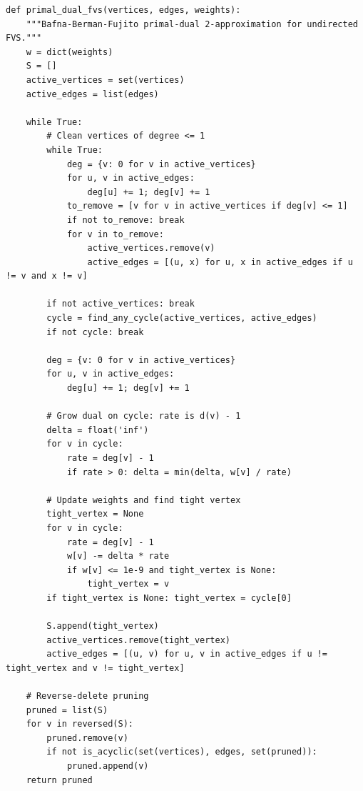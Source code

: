 \documentclass[11pt,oneside]{book}
\begin{document}
\begin{lstlisting}[style=python, caption=Primal-Dual Feedback Vertex Set]
def primal_dual_fvs(vertices, edges, weights):
    """Bafna-Berman-Fujito primal-dual 2-approximation for undirected FVS."""
    w = dict(weights)
    S = []
    active_vertices = set(vertices)
    active_edges = list(edges)
    
    while True:
        # Clean vertices of degree <= 1
        while True:
            deg = {v: 0 for v in active_vertices}
            for u, v in active_edges:
                deg[u] += 1; deg[v] += 1
            to_remove = [v for v in active_vertices if deg[v] <= 1]
            if not to_remove: break
            for v in to_remove:
                active_vertices.remove(v)
                active_edges = [(u, x) for u, x in active_edges if u != v and x != v]
                
        if not active_vertices: break
        cycle = find_any_cycle(active_vertices, active_edges)
        if not cycle: break
        
        deg = {v: 0 for v in active_vertices}
        for u, v in active_edges:
            deg[u] += 1; deg[v] += 1
            
        # Grow dual on cycle: rate is d(v) - 1
        delta = float('inf')
        for v in cycle:
            rate = deg[v] - 1
            if rate > 0: delta = min(delta, w[v] / rate)
            
        # Update weights and find tight vertex
        tight_vertex = None
        for v in cycle:
            rate = deg[v] - 1
            w[v] -= delta * rate
            if w[v] <= 1e-9 and tight_vertex is None:
                tight_vertex = v
        if tight_vertex is None: tight_vertex = cycle[0]
        
        S.append(tight_vertex)
        active_vertices.remove(tight_vertex)
        active_edges = [(u, v) for u, v in active_edges if u != tight_vertex and v != tight_vertex]
        
    # Reverse-delete pruning
    pruned = list(S)
    for v in reversed(S):
        pruned.remove(v)
        if not is_acyclic(set(vertices), edges, set(pruned)):
            pruned.append(v)
    return pruned
\end{lstlisting}
\end{document}
